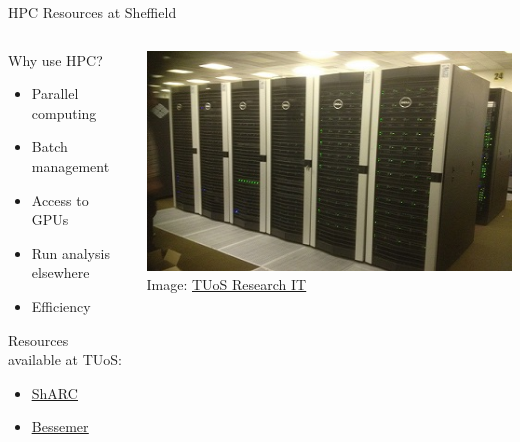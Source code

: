 \documentclass{beamer} %
\begin{document}
  \begin{frame}{HPC Resources at Sheffield}
    \begin{columns}
      \begin{column}{0.5\textwidth}
        Why use HPC?
        \begin{itemize}
          \item Parallel computing
          \item Batch management
          \item Access to GPUs
          \item Run analysis elsewhere
          \item Efficiency
        \end{itemize}

        \vspace{1cm}

        Resources available at TUoS:
        \begin{itemize}
          \item \href{https://docs.hpc.shef.ac.uk/en/latest/sharc/index.html}{\underline{ShARC}}
          \item \href{https://docs.hpc.shef.ac.uk/en/latest/bessemer/index.html}{\underline{Bessemer}}
        \end{itemize}
      \end{column}
      
      \begin{column}{0.5\textwidth}
        \includegraphics[width=\textwidth]{iceberg2014.jpg}
        \tiny{Image: \href{https://www.sheffield.ac.uk/it-services/research/hpc/sharc}{TUoS Research IT}}
      \end{column}
    \end{columns}
  \end{frame}
\end{document}
